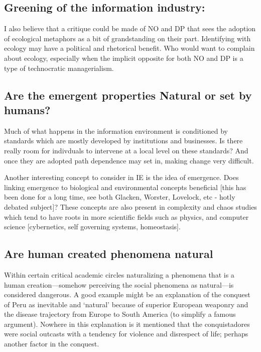\subsection{Greening of the information industry:}

I also believe that a critique could be made of NO and DP that sees the adoption of ecological metaphors as a bit of grandstanding on their part. Identifying with ecology may have a political and rhetorical benefit. Who would want to complain about ecology, especially when the implicit opposite for both NO and DP is a type of technocratic managerialism.

\subsection{Are the emergent properties Natural or set by humans?}

Much of what happens in the information environment is conditioned by standards which are mostly developed by institutions and businesses. Is there really room for indivduals to intervene at a local level on these standards? And once they are adopted path dependence may set in, making change very difficult.

Another interesting concept to consider in IE is the idea of emergence. Does linking emergence to biological and environmental concepts beneficial [this has been done for a long time, see both Glacken, Worster, Lovelock, etc - hotly debated subject]? These concepts are also present in complexity and chaos studies which tend to have roots in more scientific fields such as physics, and computer science [cybernetics, self governing systems, homeostasis].

\subsection{Are human created phenomena natural}

Within certain critical academic circles naturalizing a phenomena that is a human creation—somehow perceiving the social phenomena as natural—is considered dangerous. A good example might be an explanation of the conquest of Peru as inevitable and ‘natural’ because of superior European weaponry and the disease trajectory from Europe to South America (to simplify a famous argument). Nowhere in this explanation is it mentioned that the conquistadores were social outcasts with a tendency for violence and disrespect of life; perhaps another factor in the conquest. 

